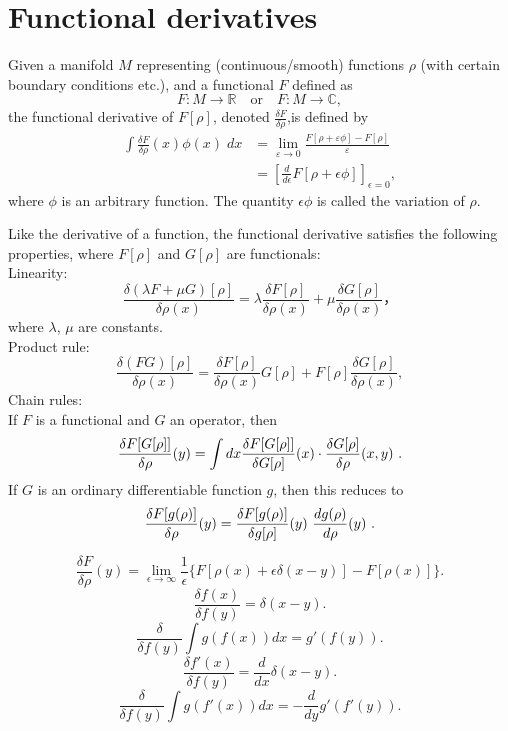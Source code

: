 \section{Functional derivatives}
\begin{newdef}
	Given a manifold $M$ representing (continuous/smooth) functions $\rho$ (with certain boundary conditions etc.), and a functional $F$ defined as
	\[F\colon M\rightarrow \mathbb {R}  \quad {\mbox{or}} \quad F\colon M\rightarrow \mathbb {C} ,\]
	the functional derivative of $F[\rho]$, denoted $\frac{\delta F}{\delta \rho}$,is defined by
	\[{\begin{aligned}\int {\frac {\delta F}{\delta \rho }}(x)\phi (x)\;dx&=\lim _{\varepsilon \to 0}{\frac {F[\rho +\varepsilon \phi ]-F[\rho ]}{\varepsilon }}\\&=\left[{\frac {d}{d\epsilon }}F[\rho +\epsilon \phi ]\right]_{\epsilon =0},\end{aligned}}\]
	where $\phi$ is an arbitrary function. The quantity $\epsilon \phi$ is called the variation of $\rho$.
\end{newdef}
\noindent
Like the derivative of a function, the functional derivative satisfies the following properties, where $F[\rho]$ and $G[\rho]$ are functionals:\\
Linearity:
\[{\frac {\delta (\lambda F+\mu G)[\rho ]}{\delta \rho (x)}}=\lambda {\frac {\delta F[\rho ]}{\delta \rho (x)}}+\mu {\frac {\delta G[\rho ]}{\delta \rho (x)}}，\]
where $\lambda$, $\mu$ are constants.\\
Product rule:
\[{\frac {\delta (FG)[\rho ]}{\delta \rho (x)}}={\frac {\delta F[\rho ]}{\delta \rho (x)}}G[\rho ]+F[\rho ]{\frac {\delta G[\rho ]}{\delta \rho (x)}},\]
Chain rules:\\
If $F$ is a functional and $G$ an operator, then
\[{\displaystyle \displaystyle {\frac {\delta F[G[\rho ]]}{\delta \rho }(y)}=\int dx{\frac {\delta F[G[\rho]]}{\delta G[\rho]}}(x)\cdot {\frac {\delta G[\rho ]}{\delta \rho}(x,y)}\ }.\]
If $G$ is an ordinary differentiable function $g$, then this reduces to
\[{\displaystyle \displaystyle {\frac {\delta F[g(\rho )]}{\delta \rho}(y)}={\frac {\delta F[g(\rho )]}{\delta g[\rho ]}(y)}\ {\frac {dg(\rho )}{d\rho }(y)}\ } .\]
\begin{newprop}
	\[\frac{\delta F}{\delta \rho} (y) = \lim_{\epsilon \to \infty} \frac{1}{\epsilon} \{ F[\rho(x) + \epsilon \delta(x-y)] - F[\rho(x)] \}.\]
	\[\frac{\delta f(x)}{\delta f(y)} = \delta(x-y).\]
	\[\frac{\delta}{\delta f(y)} \int g\left( f(x)\right) dx =  g'(f(y)).\]
	\[\frac{\delta f'(x)}{\delta f(y)} = \frac{d}{dx}\delta(x-y).\]
	\[\frac{\delta}{\delta f(y)} \int g\left( f'(x)\right) dx = -\frac{d}{dy} g'(f'(y)).\]
\end{newprop}

